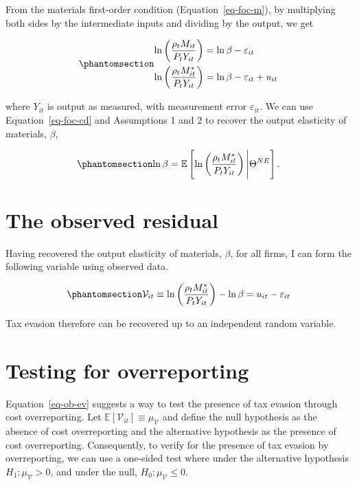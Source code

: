 \documentclass[
  12pt,
  letterpaper,
  oneside,
  openany]{report}
\begin{document}
From the materials first-order condition (Equation~\ref{eq-foc-m}), by
multiplying both sides by the intermediate inputs and dividing by the
output, we get

\begin{equation}\protect\phantomsection\label{eq-foc-cd}{
\begin{aligned}
    \ln\left(\frac{\rho_t M_{it}}{P_{t}Y_{it}}\right) &=\ln\beta - \varepsilon_{it} \\
    \ln\left(\frac{\rho_t M^*_{it}}{P_{t}Y_{it}}\right) &=\ln\beta - \varepsilon_{it}+u_{it}
\end{aligned}
}\end{equation}

where \(Y_{it}\) is output as measured, with measurement error
\(\varepsilon_{it}\). We can use Equation~\ref{eq-foc-cd} and
Assumptions 1 and 2 to recover the output elasticity of materials,
\(\beta\),

\begin{equation}\protect\phantomsection\label{eq-foc-cd-exp}{
    \ln\beta=\mathbb{E}\left[\ln\left(\frac{\rho_t M^*_{it}}{P_{t}Y_{it}}\right)\Bigg| \Theta^{NE}\right].
}\end{equation}

\section{The observed residual}\label{sec-testing-residual}

Having recovered the output elasticity of materials, \(\beta\), for all
firms, I can form the following variable using observed data.

\begin{equation}\protect\phantomsection\label{eq-ob-ev}{
    \mathcal V_{it}\equiv\ln\left(\frac{\rho_t M^*_{it}}{P_{t}Y_{it}}\right)-\ln\beta=u_{it}-\varepsilon_{it}
}\end{equation}

Tax evasion therefore can be recovered up to an independent random
variable.

\section{Testing for overreporting}\label{sec-testing-test}

Equation~\ref{eq-ob-ev} suggests a way to test the presence of tax
evasion through cost overreporting. Let
\(\mathbb{E}[\mathcal{V}_{it}]\equiv \mu_{\mathcal{V}}\) and define the
null hypothesis as the absence of cost overreporting and the alternative
hypothesis as the presence of cost overreporting. Consequently, to
verify for the presence of tax evasion by overreporting, we can use a
one-sided test where under the alternative hypothesis
\(H_1: \mu_{\mathcal{V}}>0\), and under the null,
\(H_0: \mu_{\mathcal{V}}\le0\).
\end{document}
